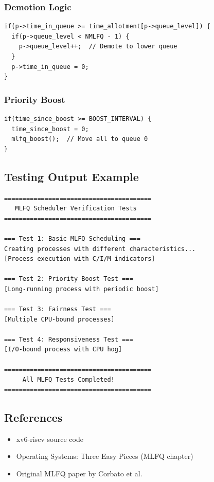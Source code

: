 \documentclass[11pt,a4paper]{article}
\begin{document}
\subsubsection{Demotion Logic}
\begin{lstlisting}
if(p->time_in_queue >= time_allotment[p->queue_level]) {
  if(p->queue_level < NMLFQ - 1) {
    p->queue_level++;  // Demote to lower queue
  }
  p->time_in_queue = 0;
}
\end{lstlisting}

\subsubsection{Priority Boost}
\begin{lstlisting}
if(time_since_boost >= BOOST_INTERVAL) {
  time_since_boost = 0;
  mlfq_boost();  // Move all to queue 0
}
\end{lstlisting}

\subsection{Testing Output Example}

\begin{lstlisting}[language=bash, basicstyle=\ttfamily\small]
========================================
   MLFQ Scheduler Verification Tests
========================================

=== Test 1: Basic MLFQ Scheduling ===
Creating processes with different characteristics...
[Process execution with C/I/M indicators]

=== Test 2: Priority Boost Test ===
[Long-running process with periodic boost]

=== Test 3: Fairness Test ===
[Multiple CPU-bound processes]

=== Test 4: Responsiveness Test ===
[I/O-bound process with CPU hog]

========================================
     All MLFQ Tests Completed!
========================================
\end{lstlisting}

\subsection{References}

\begin{itemize}
    \item xv6-riscv source code
    \item Operating Systems: Three Easy Pieces (MLFQ chapter)
    \item Original MLFQ paper by Corbato et al.
\end{itemize}
\end{document}
